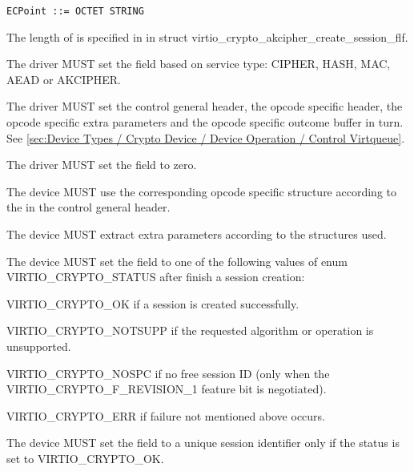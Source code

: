 \begin{lstlisting}
ECPoint ::= OCTET STRING
\end{lstlisting}

The length of  is specified in  in
struct virtio_crypto_akcipher_create_session_flf.


\begin{itemize*}
\item The driver MUST set the  field based on service type: CIPHER, HASH, MAC, AEAD or AKCIPHER.
\item The driver MUST set the control general header, the opcode specific header,
    the opcode specific extra parameters and the opcode specific outcome buffer in turn.
    See \ref{sec:Device Types / Crypto Device / Device Operation / Control Virtqueue}.
\item The driver MUST set the  field to zero.
\end{itemize*}


\begin{itemize*}
\item The device MUST use the corresponding opcode specific structure according to the
     in the control general header.
\item The device MUST extract extra parameters according to the structures used.
\item The device MUST set the  field to one of the following values of enum
    VIRTIO_CRYPTO_STATUS after finish a session creation:
\begin{itemize*}
\item VIRTIO_CRYPTO_OK if a session is created successfully.
\item VIRTIO_CRYPTO_NOTSUPP if the requested algorithm or operation is unsupported.
\item VIRTIO_CRYPTO_NOSPC if no free session ID (only when the VIRTIO_CRYPTO_F_REVISION_1
    feature bit is negotiated).
\item VIRTIO_CRYPTO_ERR if failure not mentioned above occurs.
\end{itemize*}
\item The device MUST set the  field to a unique session identifier only
    if the status is set to VIRTIO_CRYPTO_OK.
\end{itemize*}

